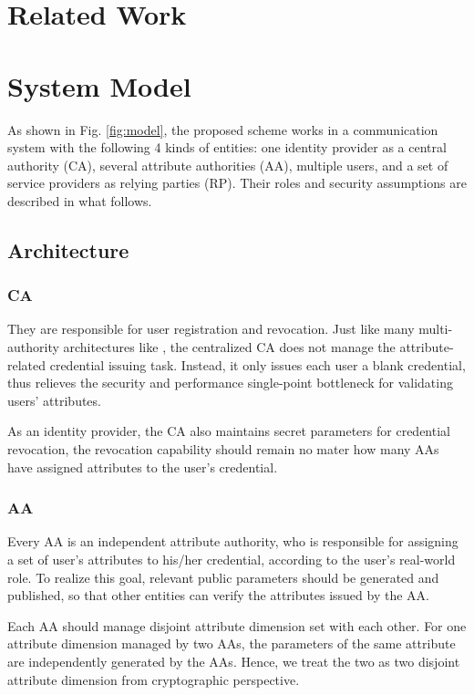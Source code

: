\documentclass[journal]{IEEEtran}
\begin{document}
\section{Related Work}\label{sec:related}

\section{System Model}\label{sec:model}
As shown in Fig. \ref{fig:model}, the proposed scheme works in a communication system with the following 4 kinds of entities: one identity provider as a central authority (CA), several attribute authorities (AA), multiple users, and a set of service providers as relying parties (RP). Their roles and security assumptions are described in what follows. 

\subsection{Architecture}
\subsubsection{CA}
They are responsible for user registration and revocation. Just like many multi-authority architectures like \cite{Chase2007Multi, yang2013dac}, the centralized CA does not manage the attribute-related credential issuing task. Instead, it only issues each user a blank credential, thus relieves the security and performance single-point bottleneck for validating users' attributes. 

As an identity provider, the CA also maintains secret parameters for credential revocation, the revocation capability should remain no mater how many AAs have assigned attributes to the user's credential.


\subsubsection{AA} Every AA is an independent attribute authority, who is responsible for assigning a set of user's attributes to his/her credential, according to the user's real-world role. To realize this goal, relevant public parameters should be generated and published, so that other entities can verify the attributes issued by the AA. 

Each AA should manage disjoint attribute dimension set with each other. For one attribute dimension managed by two AAs, the parameters of the same attribute are independently generated by the AAs. Hence, we treat the two as two disjoint attribute dimension from cryptographic perspective. 
\end{document}

